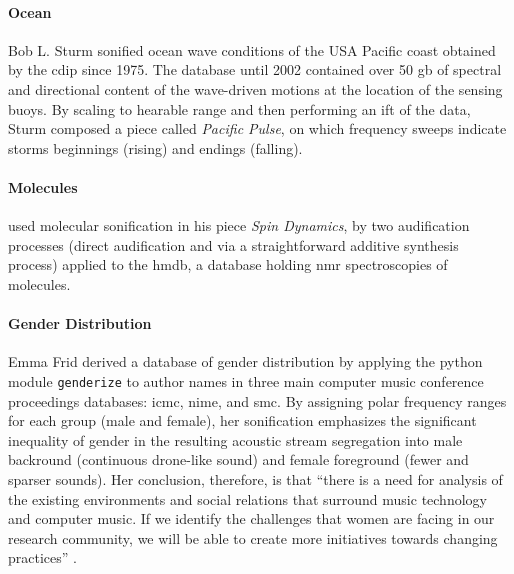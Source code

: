 \paragraph{Ocean}
Bob L. Sturm \parencite{icmc/bbp2372.2002.056} sonified ocean wave conditions of the USA Pacific coast obtained by the \gls{cdip} since 1975. The database until 2002 contained over 50 \gls{gb} of spectral and directional content of the wave-driven motions at the location of the sensing buoys. By scaling to hearable range and then performing an \gls{ift} of the data, Sturm composed a piece called \textit{Pacific Pulse}, on which frequency sweeps indicate storms beginnings (rising) and endings (falling).

\paragraph{Molecules}
\citeauthor{icmc/bbp2372.2016.002} \parencite{icmc/bbp2372.2016.002} used molecular sonification in his piece \textit{Spin Dynamics}, by two audification processes (direct audification and via a straightforward additive synthesis process) applied to the \gls{hmdb}, a database holding \gls{nmr} spectroscopies of molecules.



\paragraph{Gender Distribution}
Emma Frid \parencite{Fri17:Son} derived a database of gender distribution by applying the python module \texttt{genderize} to author names in three main computer music conference proceedings databases: \gls{icmc}, \gls{nime}, and \gls{smc}. By assigning polar frequency ranges for each group (male and female), her sonification emphasizes the significant inequality of gender in the resulting acoustic stream segregation into male backround (continuous drone-like sound) and female foreground (fewer and sparser sounds). Her conclusion, therefore, is that ``there is a need for analysis of the existing environments and social relations that surround music technology and computer music. If we identify the challenges that women are facing in our research community, we will be able to create more initiatives towards changing practices'' \parencite[238]{Fri17:Son}.


